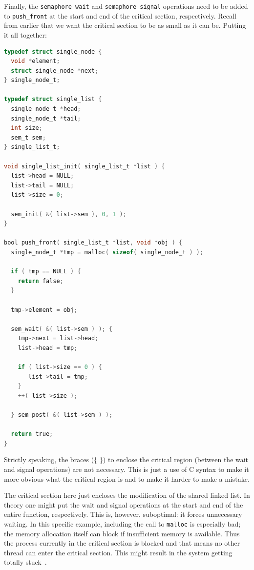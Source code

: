 Finally, the \texttt{semaphore\_wait} and \texttt{semaphore\_signal} operations need to be added to \texttt{push\_front} at the start and end of the critical section, respectively. Recall from earlier that we want the critical section to be as small as it can be. Putting it all together:

\begin{lstlisting}[language=C]
typedef struct single_node {
  void *element;
  struct single_node *next;
} single_node_t;

typedef struct single_list {
  single_node_t *head;
  single_node_t *tail;
  int size;
  sem_t sem;
} single_list_t;

void single_list_init( single_list_t *list ) {
  list->head = NULL;
  list->tail = NULL;
  list->size = 0;

  sem_init( &( list->sem ), 0, 1 );
}

bool push_front( single_list_t *list, void *obj ) {
  single_node_t *tmp = malloc( sizeof( single_node_t ) );
  
  if ( tmp == NULL ) {
    return false;
  }
  
  tmp->element = obj;
  
  sem_wait( &( list->sem ) ); {
    tmp->next = list->head;
    list->head = tmp;

    if ( list->size == 0 ) {
       list->tail = tmp;
    }
    ++( list->size );
  
  } sem_post( &( list->sem ) );  
  
  return true;
}
\end{lstlisting}

Strictly speaking, the braces (\{ \}) to enclose the critical region (between the wait and signal operations) are not necessary. This is just a use of C syntax to make it more obvious what the critical region is and to make it harder to make a mistake.

The critical section here just encloses the modification of the shared linked list. In theory one might put the wait and signal operations at the start and end of the entire function, respectively. This is, however, suboptimal: it forces unnecessary waiting. In this specific example, including the call to \texttt{malloc} is especially bad; the memory allocation itself can block if insufficient memory is available. Thus the process currently in the critical section is blocked and that means no other thread can enter the critical section. This might result in the system getting totally stuck~\cite{mte241}.





